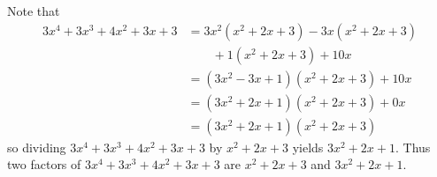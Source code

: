\begin{questions}
    \item Note that
    \begin{align*}
        3x^4 + 3x^3 + 4x^2 + 3x + 3 &= 3x^2(x^2+2x+3) - 3x(x^2+2x+3)\\
        &\quad\quad+ 1(x^2+2x+3) + 10x\\
        &= (3x^2-3x+1)(x^2+2x+3) + 10x\\
        &= (3x^2+2x+1)(x^2+2x+3) + 0x\\
        &= (3x^2+2x+1)(x^2+2x+3)
    \end{align*}
    so dividing $3x^4 + 3x^3 + 4x^2 + 3x + 3$ by $x^2+2x+3$ yields $3x^2+2x+1$. Thus two factors of $3x^4 + 3x^3 + 4x^2 + 3x + 3$ are $x^2+2x+3$ and $3x^2+2x+1$.
\end{questions}
